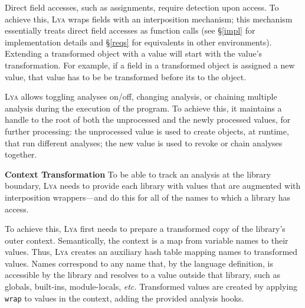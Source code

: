 \documentclass[letterpaper,twocolumn,10pt]{article}
\def\etc{{\em etc.}\xspace}
\newcommand{\heading}[1]{\vspace{2pt}\noindent\textbf{#1}\enspace}
\newcommand{\ttt}[1]{\texttt{#1}}
\newcommand{\sys}{{\scshape Lya}\xspace}
\begin{document}
Direct field accesses, such as assignments, require detection upon access.
To achieve this, \sys wraps fields with an interposition mechanism;
  this mechanism essentially treats direct field accesses as function calls (see \S\ref{impl} for implementation details and \S\ref{reqs} for equivalents in other environments).
Extending a transformed object with a value will start with the value's transformation.
For example, if a field in a transformed object is assigned a new value, that value has to be be transformed before its to the object.

\sys allows toggling analyses on/off, changing analysis, or chaining multiple analysis during the execution of the program.
To achieve this, it maintains a handle to the root of both the unprocessed and the newly processed values, for further processing:
  the unprocessed value is used to create objects, at runtime, that run different analyses;
  the new value is used to revoke or chain analyses together.

\heading{Context Transformation}
To be able to track an analysis at the library boundary, \sys needs to provide each library with values that are augmented with interposition wrappers---and do this for all of the names to which a library has access.

To achieve this, \sys first needs to prepare a transformed copy of the library's outer context.
Semantically, the context is a map from variable names to their values.
Thus, \sys creates an auxiliary hash table mapping names to transformed values.
Names correspond to any name that, by the language definition, is accessible by the library and resolves to a value outside that library, such as globals, built-ins, module-locals, \etc
Transformed values are created by applying \ttt{wrap} to values in the context, adding the provided analysis hooks.

\end{document}

